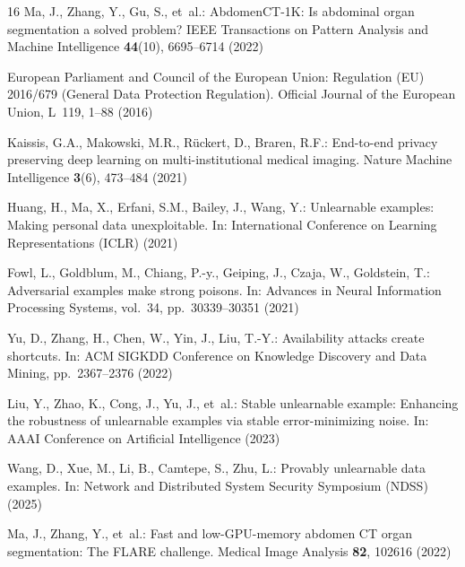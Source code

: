 \documentclass[runningheads]{llncs}
\begin{document}
\begin{thebibliography}{16}
Ma, J., Zhang, Y., Gu, S., et~al.:
AbdomenCT-1K: Is abdominal organ segmentation a solved problem?
IEEE Transactions on Pattern Analysis and Machine Intelligence
\textbf{44}(10), 6695--6714 (2022)

{European Parliament and Council of the European Union}:
Regulation ({EU}) 2016/679 (General Data Protection Regulation).
Official Journal of the European Union, L~119, 1--88 (2016)

Kaissis, G.A., Makowski, M.R., R{\"u}ckert, D., Braren, R.F.:
End-to-end privacy preserving deep learning on multi-institutional medical
imaging.
Nature Machine Intelligence \textbf{3}(6), 473--484 (2021)

Huang, H., Ma, X., Erfani, S.M., Bailey, J., Wang, Y.:
Unlearnable examples: Making personal data unexploitable.
In: International Conference on Learning Representations (ICLR) (2021)

Fowl, L., Goldblum, M., Chiang, P.-y., Geiping, J., Czaja, W., Goldstein, T.:
Adversarial examples make strong poisons.
In: Advances in Neural Information Processing Systems, vol.~34,
pp.~30339--30351 (2021)

Yu, D., Zhang, H., Chen, W., Yin, J., Liu, T.-Y.:
Availability attacks create shortcuts.
In: ACM SIGKDD Conference on Knowledge Discovery and Data Mining,
pp.~2367--2376 (2022)

Liu, Y., Zhao, K., Cong, J., Yu, J., et~al.:
Stable unlearnable example: Enhancing the robustness of unlearnable examples
via stable error-minimizing noise.
In: AAAI Conference on Artificial Intelligence (2023)

Wang, D., Xue, M., Li, B., Camtepe, S., Zhu, L.:
Provably unlearnable data examples.
In: Network and Distributed System Security Symposium (NDSS) (2025)

Ma, J., Zhang, Y., et~al.:
Fast and low-{GPU}-memory abdomen {CT} organ segmentation: The {FLARE}
challenge.
Medical Image Analysis \textbf{82}, 102616 (2022)

\end{thebibliography}
%
\end{document}
